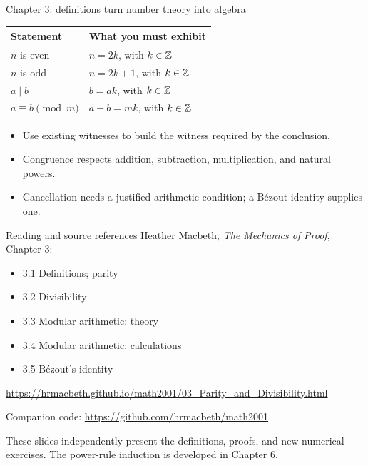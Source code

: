 \begin{frame}{Chapter 3: definitions turn number theory into algebra}
\begin{center}
\begin{tabular}{ll}
\toprule
Statement & What you must exhibit \\
\midrule
$n$ is even & $n=2k$, with $k\in\mathbb{Z}$ \\
$n$ is odd & $n=2k+1$, with $k\in\mathbb{Z}$ \\
$a\mid b$ & $b=ak$, with $k\in\mathbb{Z}$ \\
$a\equiv b\pmod m$ & $a-b=mk$, with $k\in\mathbb{Z}$ \\
\bottomrule
\end{tabular}
\end{center}
\begin{itemize}
\item Use existing witnesses to build the witness required by the conclusion.
\item Congruence respects addition, subtraction, multiplication, and natural powers.
\item Cancellation needs a justified arithmetic condition; a B\'ezout identity supplies one.
\end{itemize}
\end{frame}

\begin{frame}{Reading and source references}
Heather Macbeth, \emph{The Mechanics of Proof}, Chapter 3:
\begin{itemize}
\item 3.1 Definitions; parity
\item 3.2 Divisibility
\item 3.3 Modular arithmetic: theory
\item 3.4 Modular arithmetic: calculations
\item 3.5 B\'ezout's identity
\end{itemize}
\small
\url{https://hrmacbeth.github.io/math2001/03_Parity_and_Divisibility.html}
\par\medskip
Companion code: \url{https://github.com/hrmacbeth/math2001}
\par\medskip
These slides independently present the definitions, proofs, and new numerical exercises.
The power-rule induction is developed in Chapter 6.
\end{frame}


